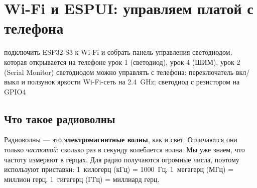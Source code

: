 \section{Wi-Fi и ESPUI: управляем платой с телефона}\label{les:radio}
\lessonintro
  {подключить ESP32-S3 к Wi-Fi и собрать панель управления светодиодом, которая открывается на телефоне}
  {урок 1 (светодиод), урок 4 (ШИМ), урок 2 (Serial Monitor)}
  {светодиодом можно управлять с телефона: переключатель вкл/выкл и ползунок яркости}
  {Wi-Fi-сеть на \SI{2.4}{GHz}; светодиод с резистором на GPIO4}


\subsection{Что такое радиоволны}

Радиоволны --- это \textbf{электромагнитные волны}, как и свет. Отличаются они только
\emph{частотой}: сколько раз в секунду колеблется волна. Мы уже знаем, что частоту измеряют в герцах.
Для радио получаются огромные числа, поэтому используют приставки:
1~килогерц (кГц) = 1000~Гц, 1~мегагерц (МГц) = миллион герц, 1~гигагерц (ГГц) = миллиард герц.

